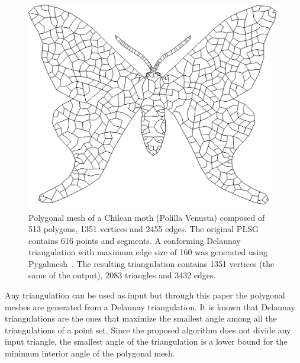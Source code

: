 \documentclass[lineno,pdflatex,sn-mathphys]{sn-jnl}%
\theoremstyle{thmstyleone}%
\theoremstyle{thmstyletwo}%
\theoremstyle{thmstylethree}%
\begin{document}
\begin{figure}
\centering
\includegraphics[width=0.8\linewidth]{polyllalogo2.png} 
%
\caption{Polygonal mesh of a Chilean moth (Polilla Venusta) composed of 513 polygons, 1351 vertices and 2455 edges. The original PLSG contains 616 points and segments. A conforming Delaunay triangulation with  maximum edge size of 160 was generated using Pygalmesh~\cite{Schlomer_pygalmesh_Python_interface}. The resulting triangulation contains 1351 vertices (the same of the output), 2083 triangles and 3432 edges.}
\label{fig:logo}    
\end{figure}

Any triangulation can be used as input but through this paper the polygonal meshes are generated from a Delaunay triangulation. It is known that  Delaunay triangulations are the ones that maximize the smallest angle among all the triangulations of a  point set. Since the proposed algorithm does not divide any input triangle, the smallest angle of the triangulation is a lower bound for the minimum interior angle of the polygonal mesh.


%
\end{document}
